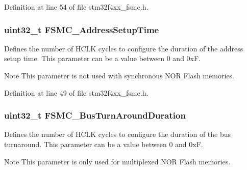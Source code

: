 Definition at line 54 of file stm32f4xx\-\_\-fsmc.\-h.

\hypertarget{struct_f_s_m_c___n_o_r_s_r_a_m_timing_init_type_def_a947aed7df4d7c0d0959e1af373780b44}{
\subsubsection[{F\-S\-M\-C\-\_\-\-Address\-Setup\-Time}]{\setlength{\rightskip}{0pt plus 5cm}uint32\-\_\-t F\-S\-M\-C\-\_\-\-Address\-Setup\-Time}}\label{struct_f_s_m_c___n_o_r_s_r_a_m_timing_init_type_def_a947aed7df4d7c0d0959e1af373780b44}
Defines the number of H\-C\-L\-K cycles to configure the duration of the address setup time. This parameter can be a value between 0 and 0x\-F. \begin{DoxyNote}{Note}
This parameter is not used with synchronous N\-O\-R Flash memories. 
\end{DoxyNote}


Definition at line 49 of file stm32f4xx\-\_\-fsmc.\-h.

\hypertarget{struct_f_s_m_c___n_o_r_s_r_a_m_timing_init_type_def_a015f5751cbb8c607102d8c735988c5c7}{
\subsubsection[{F\-S\-M\-C\-\_\-\-Bus\-Turn\-Around\-Duration}]{\setlength{\rightskip}{0pt plus 5cm}uint32\-\_\-t F\-S\-M\-C\-\_\-\-Bus\-Turn\-Around\-Duration}}\label{struct_f_s_m_c___n_o_r_s_r_a_m_timing_init_type_def_a015f5751cbb8c607102d8c735988c5c7}
Defines the number of H\-C\-L\-K cycles to configure the duration of the bus turnaround. This parameter can be a value between 0 and 0x\-F. \begin{DoxyNote}{Note}
This parameter is only used for multiplexed N\-O\-R Flash memories. 
\end{DoxyNote}


